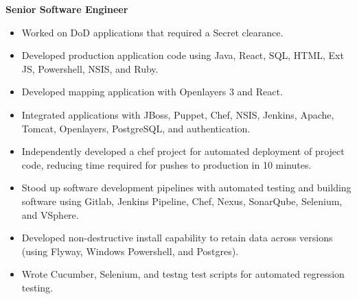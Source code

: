 \documentclass[12pt, line, margin]{res}
\begin{document}
\begin{resume}
                \textbf{Senior Software Engineer} 
                 \begin{itemize}  \itemsep -2pt %
	      \item   Worked on DoD applications that required a Secret clearance.
	      \item   Developed production application code using Java, React, SQL, \newline
                                HTML, Ext JS, Powershell, NSIS, and Ruby.
	      \item   Developed mapping application with Openlayers 3 and React.
	      \item   Integrated applications with JBoss, Puppet, Chef, NSIS, Jenkins,
                               Apache, Tomcat, Openlayers, PostgreSQL, and authentication.
	      \item   Independently developed a chef project for automated \newline 
                                deployment of project code, reducing time required for\newline
                                pushes to production in 10 minutes.
	      \item   Stood up software development pipelines with automated testing \newline
                               and building software using Gitlab, Jenkins Pipeline, Chef, Nexus,
                               SonarQube, Selenium, and VSphere.
	      \item   Developed non-destructive install capability to retain data across\newline
                               versions (using Flyway, Windows Powershell, and Postgres). 
                \item   Wrote Cucumber, Selenium, and testng test scripts for automated \newline
                               regression testing.
                \end{itemize}
 
\pagebreak


\end{resume}
\end{document}
